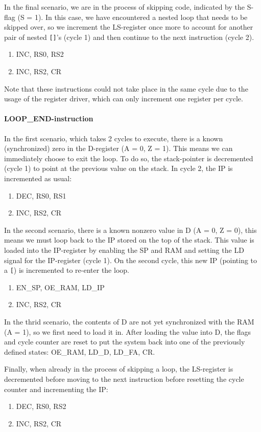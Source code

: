 In the final scenario, we are in the process of skipping code, indicated by the S-flag (S = 1). In this case, we have encountered a nested loop that needs to be skipped over, so we increment the LS-register once more to account for another pair of nested \texttt{[]}'s (cycle 1) and then continue to the next instruction (cycle 2).
\begin{enumerate}
\item INC, RS0, RS2
\item INC, RS2, CR
\end{enumerate}
Note that these instructions could not take place in the same cycle due to the usage of the register driver, which can only increment one register per cycle.

\paragraph{LOOP\_END-instruction} In the first scenario, which takes 2 cycles to execute, there is a known (synchronized) zero in the D-register (A = 0, Z = 1). This means we can immediately choose to exit the loop. To do so, the stack-pointer is decremented (cycle 1) to point at the previous value on the stack. In cycle 2, the IP is incremented as usual:
\begin{enumerate}
\item DEC, RS0, RS1  
\item INC, RS2, CR
\end{enumerate}

In the second scenario, there is a known nonzero value in D (A = 0, Z = 0), this means we must loop back to the IP stored on the top of the stack. This value is loaded into the IP-register by enabling the SP and RAM and setting the LD signal for the IP-register (cycle 1). On the second cycle, this new IP (pointing to a \texttt{[}) is incremented to re-enter the loop.
\begin{enumerate}
\item EN\_SP, OE\_RAM, LD\_IP
\item INC, RS2, CR
\end{enumerate}
  
In the thrid scenario, the contents of D are not yet synchronized with the RAM (A = 1), so we first need to load it in. After loading the value into D, the flags and cycle counter are reset to put the system back into one of the previously defined states: OE\_RAM, LD\_D, LD\_FA, CR.

Finally, when already in the process of skipping a loop, the LS-register is decremented before moving to the next instruction before resetting the cycle counter and incrementing the IP:
\begin{enumerate}
\item DEC, RS0, RS2
\item INC, RS2, CR
\end{enumerate}

